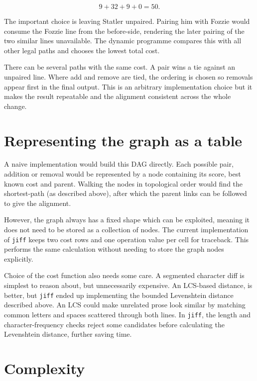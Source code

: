 \documentclass[
]{article}
\begin{document}
\[9+32+9+0=50.\]

The important choice is leaving Statler unpaired. Pairing him with
Fozzie would consume the Fozzie line from the before-side, rendering the
later pairing of the two similar lines unavailable. The dynamic
programme compares this with all other legal paths and chooses the
lowest total cost.

There can be several paths with the same cost. A pair wins a tie against
an unpaired line. Where add and remove are tied, the ordering is chosen
so removals appear first in the final output. This is an arbitrary
implementation choice but it makes the result repeatable and the
alignment consistent across the whole change.

\hypertarget{representing-the-graph-as-a-table}{%
\section{Representing the graph as a
table}\label{representing-the-graph-as-a-table}}

A naive implementation would build this DAG directly. Each possible
pair, addition or removal would be represented by a node containing its
score, best known cost and parent. Walking the nodes in topological
order would find the shortest-path (as described above), after which the
parent links can be followed to give the alignment.

However, the graph always has a fixed shape which can be exploited,
meaning it does not need to be stored as a collection of nodes. The
current implementation of \texttt{jiff} keeps two cost rows and one
operation value per cell for traceback. This performs the same
calculation without needing to store the graph nodes explicitly.

Choice of the cost function also needs some care. A segmented character
diff is simplest to reason about, but unnecessarily expensive. An
LCS-based distance, is better, but \texttt{jiff} ended up implementing
the bounded Levenshtein distance described above. An LCS could make
unrelated prose look similar by matching common letters and spaces
scattered through both lines. In \texttt{jiff}, the length and
character-frequency checks reject some candidates before calculating the
Levenshtein distance, further saving time.

\hypertarget{complexity}{%
\section{Complexity}\label{complexity}}
\end{document}
